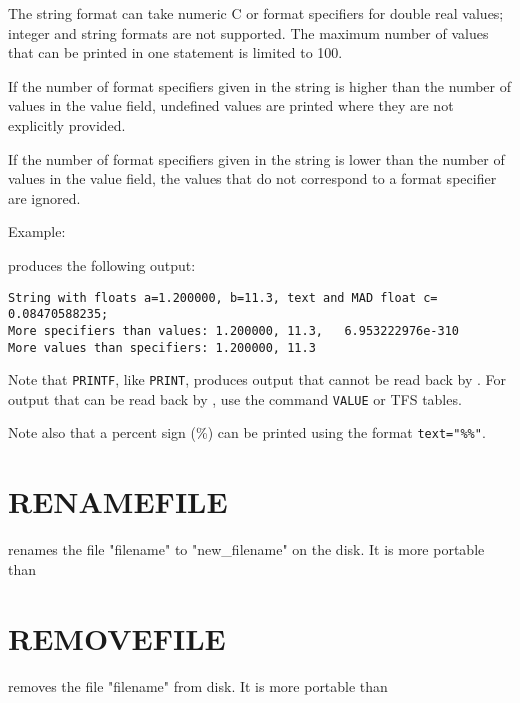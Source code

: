 The string format can take numeric C or \madx format specifiers for
double real values; integer and string formats are not supported. 
The maximum number of values that can be printed in one
statement is limited to 100. 

If the number of format specifiers given in the string is higher 
than the number of values in the value field, undefined values are printed 
where they are not explicitly provided. 

If the number of format specifiers given in the string is lower 
than the number of values in the value field, the values that 
do not correspond to a format specifier are ignored. 


Example: \\

produces the following output:
\begin{verbatim}
String with floats a=1.200000, b=11.3, text and MAD float c=     0.08470588235;
More specifiers than values: 1.200000, 11.3,   6.953222976e-310
More values than specifiers: 1.200000, 11.3
\end{verbatim}

Note that \texttt{PRINTF}, like \texttt{PRINT}, produces output that
cannot be read back by \madx. For output that can be read back by \madx,
use the command \texttt{VALUE} or TFS tables.

Note also that a percent sign (\%) can be printed using the format
\verb|text="%%"|. 


\section{RENAMEFILE}
\label{sec:renamefile}
renames the file "filename" to "new\_filename" on the disk. It is more
portable than  

\section{REMOVEFILE}
\label{sec:removefile}
removes the file "filename" from disk. It is more portable than  



